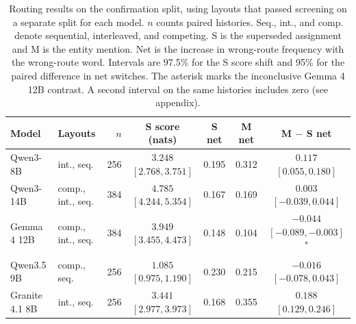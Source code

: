 \begin{table}[t]
\centering
\begin{tabular}{@{}llrcccc@{}}
\toprule
Model & Layouts & $n$ & S score (nats) & S net & M net & M $-$ S net \\
\midrule
Qwen3-8B & int., seq. & 256 & $3.248$ ${[2.768, 3.751]}$ & 0.195 & 0.312 & $0.117$ ${[0.055, 0.180]}$ \\
Qwen3-14B & comp., int., seq. & 384 & $4.785$ ${[4.244, 5.354]}$ & 0.167 & 0.169 & $0.003$ ${[-0.039, 0.044]}$ \\
Gemma 4 12B & comp., int., seq. & 384 & $3.949$ ${[3.455, 4.473]}$ & 0.148 & 0.104 & $-0.044$ ${[-0.089, -0.003]}$\textsuperscript{*} \\
Qwen3.5 9B & comp., seq. & 256 & $1.085$ ${[0.975, 1.190]}$ & 0.230 & 0.215 & $-0.016$ ${[-0.078, 0.043]}$ \\
Granite 4.1 8B & int., seq. & 256 & $3.441$ ${[2.977, 3.973]}$ & 0.168 & 0.355 & $0.188$ ${[0.129, 0.246]}$ \\
\bottomrule
\end{tabular}
\caption{Routing results on the confirmation split, using layouts that passed screening on a separate split for each model. $n$ counts paired histories. Seq., int., and comp. denote sequential, interleaved, and competing. S is the superseded assignment and M is the entity mention. Net is the increase in wrong-route frequency with the wrong-route word. Intervals are 97.5\% for the S score shift and 95\% for the paired difference in net switches. The asterisk marks the inconclusive Gemma 4 12B contrast. A second interval on the same histories includes zero (see appendix).}
\label{tab:routing}
\end{table}
